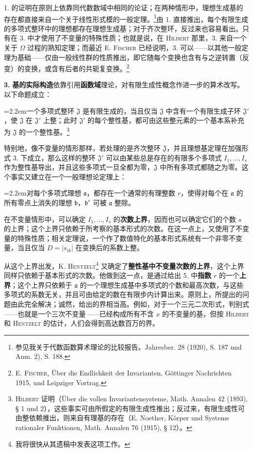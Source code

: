 \documentclass[11pt]{article}
\newcommand{\D}{\mathit D}
\newcommand{\ma}{\mathfrak a}
\newcommand{\mb}{\mathfrak b}
\newcommand{\mJ}{\mathfrak J}
\newcommand{\srcemph}[1]{\textbf{#1}}
\newcommand{\srcname}[1]{\textsc{#1}}
\newcommand{\PXXIIIitem}[2]{\par\noindent\hangindent=2.2em\hangafter=1\makebox[2.2em][l]{#1.}#2\par}
\begin{document}
1. 的证明在原则上依靠同代数数域中相同的论证；在两种情形中，理想生成基的存在都直接来自一个关于线性形式模的一般定理。\footnote{参见我关于代数函数算术理论的比较报告。Jahresber. 28 (1920), S. 187 und Anm. 2), S. 188.}由 1. 直接推出，每个有限生成的多项式整环中的理想都存在理想生成基；对于齐次整环，反过来也容易看出。只有在 3. 中才使用了不变量的特殊性质；也就是说，在 \srcname{Hilbert} 那里，3. 来自一个关于 $\Omega$ 过程的熟知定理；而最近 E. \srcname{Fischer} 已经说明，3. 可以——以其他一般定理为基础——仅由一般线性群的性质推出，即它随每个变换也含有与之逆转置（反变）的变换，或含有后者的共轭复变换。\footnote{E. \textsc{Fischer}, Über die Endlichkeit der Invarianten. Göttinger Nachrichten 1915, und Leipziger Vortrag.}

\textbf{3.} \srcemph{基的实际构造}依靠引用\srcemph{函数域}理论，对有限生成性概念作进一步的算术改写。以下命题成立：
\PXXIIIitem{4}{一个多项式整环 $\mJ$ 是有限生成的，当且仅当 $\mJ$ 中含有一个有限生成子环 $\mJ'$，使 $\mJ$ 在 $\mJ'$ 上整；此时 $\mJ'$ 的每个整性基，都可由这些整元素的一个基本系补充为 $\mJ$ 的一个整性基。\footnote{\textsc{Hilbert} 证明（Über die vollen Invariantensysteme, Math. Annalen 42 (1893), § 1 und 2），这些事实可由所假定的有限生成性推出；反过来，有限生成性可由整依赖推出，则来自有理基的存在（E. Noether, Körper und Systeme rationaler Funktionen, Math. Annalen 76 (1915), § 12）。}}
特别地，像不变量的情形那样，若处理的是齐次整环 $\mJ$，并且理想基定理在加强形式 3. 下成立，那么这样的整环 $\mJ'$ 可以由某些总是存在的有限多个多项式 $I_1,\ldots,I_s$ 作为整性基导出，并且这些多项式一旦全都为零，$\mJ$ 中所有多项式都随之为零。这个事实又建立在一个一般理想论定理上：
\PXXIIIitem{5}{对每个多项式理想 $\ma$，都存在一个通常的有理整数 $r$，使得对每个在 $\ma$ 的所有零点上消失的理想 $\mb$，$\mb^r$ 可被 $\ma$ 整除。}

在不变量情形中，可以确定 $I_1,\ldots,I_s$ 的\srcemph{次数上界}，因而也可以确定它们的个数 $s$ 的上界；这个上界只依赖于所考察的基本形式的次数。在这一点上，又使用了不变量的特殊性质；相关定理说，一个作了数值特化的基本形式系统有一个非零不变量，当且仅当 $\D=|s_{ik}|$ 在变换后的系数上整。

从这个上界出发，K. \srcname{Hentzelt}\footnote{我将很快从其遗稿中发表这项工作。} 又确定了\srcemph{整性基中不变量次数的上界}，这个上界同样只依赖于基本形式的次数。他做到这一点，是通过给出 5. 中\srcemph{指数} $r$ 的一个\srcemph{上界}；这个上界只依赖于 $\ma$ 的一个理想生成基中多项式的个数和最高次数，与这些多项式的系数无关，并且可由给定的数在有限步内计算出来。原则上，所提出的问题由此完全解决；诚然，给出的界相当高。例如，对于一个三元二次形式，判别式——也就是一个三次不变量——已经构成所有不含 $x$ 的不变量的基，但按 \srcname{Hilbert} 和 \srcname{Hentzelt} 的估计，人们会得到高达数百万的界。
\end{document}
